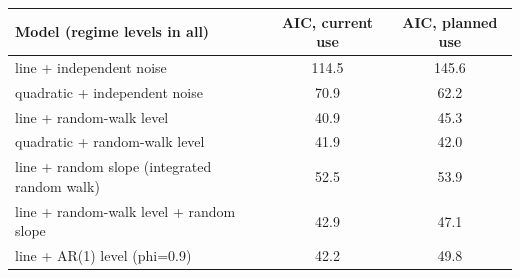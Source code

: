 \begin{tabular}{lcc}
\toprule
Model (regime levels in all) & AIC, current use & AIC, planned use \\
\midrule
line + independent noise & 114.5 & 145.6 \\
quadratic + independent noise & 70.9 & 62.2 \\
line + random-walk level & 40.9 & 45.3 \\
quadratic + random-walk level & 41.9 & 42.0 \\
line + random slope (integrated random walk) & 52.5 & 53.9 \\
line + random-walk level + random slope & 42.9 & 47.1 \\
line + AR(1) level (phi=0.9) & 42.2 & 49.8 \\
\bottomrule
\end{tabular}
